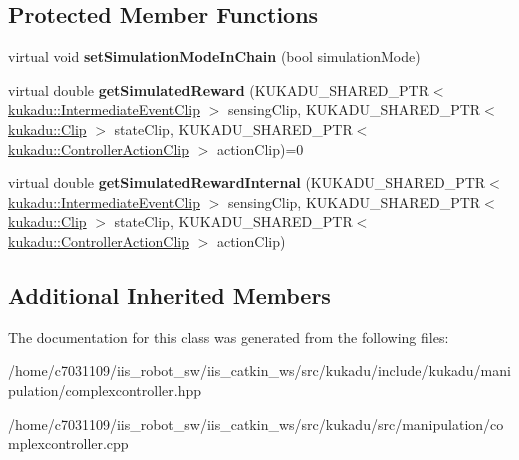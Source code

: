 \subsection*{Protected Member Functions}
\begin{DoxyCompactItemize}
\item 
\hypertarget{classkukadu_1_1ComplexController_a2abbd88cfc88f55d35c86a2ddca771f0}{virtual void {\bfseries set\-Simulation\-Mode\-In\-Chain} (bool simulation\-Mode)}\label{classkukadu_1_1ComplexController_a2abbd88cfc88f55d35c86a2ddca771f0}

\item 
\hypertarget{classkukadu_1_1ComplexController_a8af22fa4135f762dc8cae841e73f13d1}{virtual double {\bfseries get\-Simulated\-Reward} (K\-U\-K\-A\-D\-U\-\_\-\-S\-H\-A\-R\-E\-D\-\_\-\-P\-T\-R$<$ \hyperlink{classkukadu_1_1IntermediateEventClip}{kukadu\-::\-Intermediate\-Event\-Clip} $>$ sensing\-Clip, K\-U\-K\-A\-D\-U\-\_\-\-S\-H\-A\-R\-E\-D\-\_\-\-P\-T\-R$<$ \hyperlink{classkukadu_1_1Clip}{kukadu\-::\-Clip} $>$ state\-Clip, K\-U\-K\-A\-D\-U\-\_\-\-S\-H\-A\-R\-E\-D\-\_\-\-P\-T\-R$<$ \hyperlink{classkukadu_1_1ControllerActionClip}{kukadu\-::\-Controller\-Action\-Clip} $>$ action\-Clip)=0}\label{classkukadu_1_1ComplexController_a8af22fa4135f762dc8cae841e73f13d1}

\item 
\hypertarget{classkukadu_1_1ComplexController_a04cfd1f3b8c67f4adbda4d72e487316d}{virtual double {\bfseries get\-Simulated\-Reward\-Internal} (K\-U\-K\-A\-D\-U\-\_\-\-S\-H\-A\-R\-E\-D\-\_\-\-P\-T\-R$<$ \hyperlink{classkukadu_1_1IntermediateEventClip}{kukadu\-::\-Intermediate\-Event\-Clip} $>$ sensing\-Clip, K\-U\-K\-A\-D\-U\-\_\-\-S\-H\-A\-R\-E\-D\-\_\-\-P\-T\-R$<$ \hyperlink{classkukadu_1_1Clip}{kukadu\-::\-Clip} $>$ state\-Clip, K\-U\-K\-A\-D\-U\-\_\-\-S\-H\-A\-R\-E\-D\-\_\-\-P\-T\-R$<$ \hyperlink{classkukadu_1_1ControllerActionClip}{kukadu\-::\-Controller\-Action\-Clip} $>$ action\-Clip)}\label{classkukadu_1_1ComplexController_a04cfd1f3b8c67f4adbda4d72e487316d}

\end{DoxyCompactItemize}
\subsection*{Additional Inherited Members}


The documentation for this class was generated from the following files\-:\begin{DoxyCompactItemize}
\item 
/home/c7031109/iis\-\_\-robot\-\_\-sw/iis\-\_\-catkin\-\_\-ws/src/kukadu/include/kukadu/manipulation/complexcontroller.\-hpp\item 
/home/c7031109/iis\-\_\-robot\-\_\-sw/iis\-\_\-catkin\-\_\-ws/src/kukadu/src/manipulation/complexcontroller.\-cpp\end{DoxyCompactItemize}
